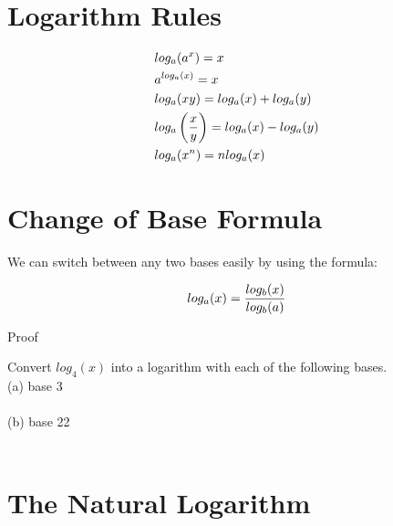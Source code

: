 \section{Logarithm Rules}

\begin{theorem}
	\begin{align}
		 & log_a(a^x) = x                                      \\
		 & a^{log_a(x)} = x                                    \\
		 & log_a(xy) = log_a(x) + log_a(y)                     \\
		 & log_a\left({x \over y}\right) = log_a(x) - log_a(y) \\
		 & log_a(x^n) = nlog_a(x)
	\end{align}
\end{theorem}

\section{Change of Base Formula}

We can switch between any two bases easily by using the formula: \\

\begin{theorem}
	\begin{align}
		log_a(x) = {log_b(x) \over log_b(a)}
	\end{align}
\end{theorem}

\begin{exercise}\nonumber
	Proof
	
	\vspace{5cm}
\end{exercise}

\begin{exercise}\nonumber
	Convert $ log_4(x) $ into a logarithm with each of the following bases. \\

	(a) base 3
	\\
	\\

	(b) base 22
	\\
	\\
\end{exercise}

\section{The Natural Logarithm}

